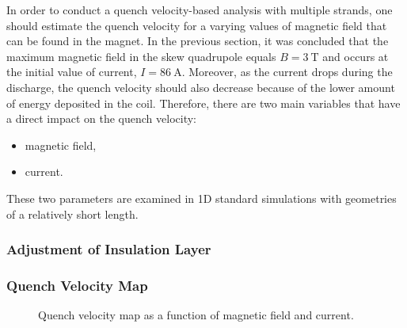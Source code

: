
In order to conduct a quench velocity-based analysis with multiple strands, one should estimate the quench velocity for a varying values of magnetic field that can be found in the magnet. In the previous section, it was concluded that the maximum magnetic field in the skew quadrupole equals $B=3~\text{T}$ and occurs at the initial value of current, $I=86~\text{A}$. Moreover, as the current drops during the discharge, the quench velocity should also decrease because of the lower amount of energy deposited in the coil. Therefore, there are two main variables that have a direct impact on the quench velocity: 
\begin{itemize}
    \item magnetic field,
    \item current.
\end{itemize}
These two parameters are examined in 1D standard simulations with geometries of a relatively short length. 

\subsubsection{Adjustment of Insulation Layer}




\subsubsection{Quench Velocity Map}

\begin{figure}[H]
\centering
    \caption{Quench velocity map as a function of magnetic field and current.}
    \label{fig: v_quench_map_current_b_field}
\end{figure}